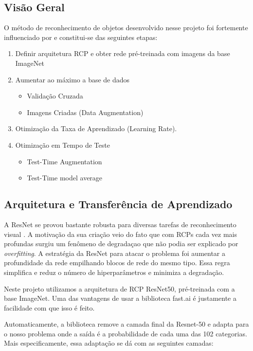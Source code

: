 \documentclass[conference]{IEEEtran}
\begin{document}
\subsection{Visão Geral}
O método de reconhecimento de objetos desenvolvido nesse projeto foi fortemente influenciado por \cite{fastai} e constitui-se das seguintes etapas:

 \begin{enumerate}
  \item Definir arquitetura RCP e obter rede pré-treinada com imagens da base ImageNet
  \item Aumentar ao máximo a base de dados
  \begin{itemize}
    \item Validação Cruzada
    \item Imagens Criadas (Data Augmentation)
  \end{itemize}
  \item Otimização da Taxa de Aprendizado (Learning Rate).
  \item Otimização em Tempo de Teste
    \begin{itemize}
    \item Test-Time Augmentation
    \item Test-Time model average
   \end{itemize}
\end{enumerate}

\subsection{Arquitetura e Transferência de Aprendizado}

A ResNet se provou bastante robusta para diversas tarefas de reconhecimento visual \cite{resnext}.  A motivação da sua criação veio do fato que com RCPs cada vez mais profundas surgiu um fenômeno de degradaçao que não podia ser explicado por \textit{overfitting}. A estratégia da ResNet para atacar o problema foi aumentar a profundidade da rede empilhando blocos de rede do mesmo tipo. Essa regra simplifica e reduz o número de hiperparâmetros e minimiza a degradação.

Neste projeto utilizamos a arquitetura de RCP ResNet50, pré-treinada com a base ImageNet. Uma das vantagens de usar a biblioteca fast.ai\cite{fastai} é justamente a facilidade com que isso é feito. 

Automaticamente, a biblioteca remove a camada final da Resnet-50 e adapta para o nosso problema onde a saída é a probabilidade de cada uma das 102 categorias. Mais especificamente, essa adaptação se dá com as seguintes camadas:
\end{document}
